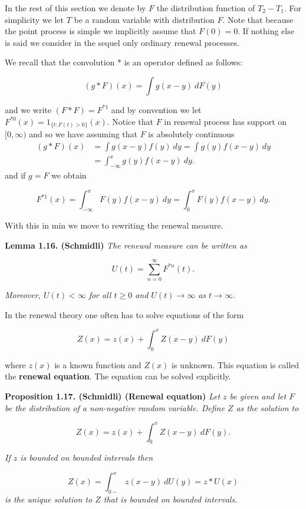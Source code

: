 \documentclass[a4paper,12pt,openany]{book}
\begin{document}
In the rest of this section we denote by \(F\) the distribution function of \(T_2 − T_1\). For simplicity we let \(T\) be a random variable with distribution \(F\). Note that because the point process is simple we implicitly assume that \(F(0) = 0\). If nothing else is said we consider in the sequel only ordinary renewal processes.

We recall that the convolution \(*\) is an operator defined as follows:

\[
(g * F)(x)=\int g(x-y)\ dF(y)
\]

and we write \((F * F)=F^{*1}\) and by convention we let \(F^{*0}(x)=1_{\{t : F(t)>0\}}(x)\). Notice that \(F\) in renewal process has support on \([0,\infty)\) and so we have assuming that \(F\) is absolutely continuous
\begin{align*}
(g*F)(x)&=\int g(x-y)f(y)\ dy=\int g(y)f(x-y)\ dy\\
&=\int_{-\infty}^x  g(y)f(x-y)\ dy.
\end{align*}
and if \(g=F\) we obtain

\[
F^{*1}(x)=\int_{-\infty}^x F(y)f(x-y)\ dy=\int_0^x F(y)f(x-y)\ dy.
\]

With this in min we move to rewriting the renewal measure.

\textbf{Lemma 1.16. (Schmidli)} \emph{The renewal measure can be written as}

\[
U(t)=\sum_{n=0}^\infty F^{*n}(t).
\]

\emph{Moreover, \(U(t)<\infty\) for all \(t\ge 0\) and \(U(t)\to\infty\) as \(t\to \infty\).}

In the renewal theory one often has to solve equations of the form

\[
Z(x)=z(x)+\int_{0}^x Z(x-y)\ dF(y)
\]

where \(z(x)\) is a known function and \(Z(x)\) is unknown. This equation is called the \textbf{renewal equation}. The equation can be solved explicitly.

\textbf{Proposition 1.17. (Schmidli) (Renewal equation)} \emph{Let \(z\) be given and let \(F\) be the distribution of a non-negative random variable. Define \(Z\) as the solution to}

\[
Z(x)=z(x)+\int_{0}^x Z(x-y)\ dF(y).
\]

\emph{If \(z\) is bounded on bounded intervals then}

\[
Z(x)=\int_{0-}^x z(x-y)\ dU(y)=z*U(x)
\]
\emph{is the unique solution to \(Z\) that is bounded on bounded intervals.}
\end{document}
